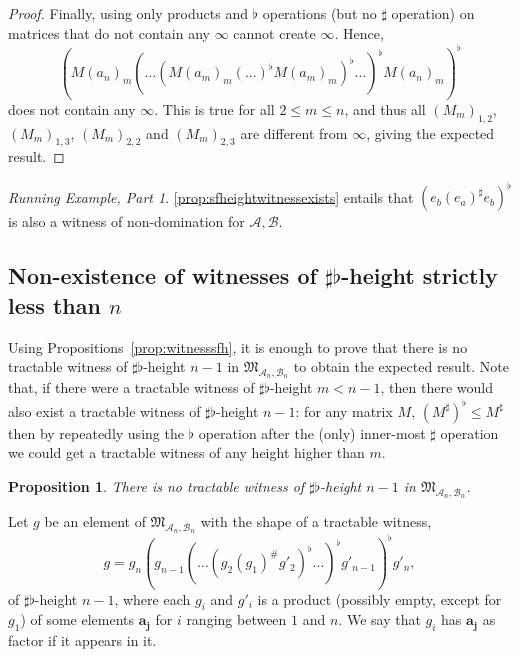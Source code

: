 \documentclass[10pt,a4paper]{amsart}
\newtheorem{prop}[prop]{Proposition}
\theoremstyle{definition}
\numberwithin{equation}{section}
\theoremstyle{remark}
\newcommand{\ideal}{\mathfrak{M}}
\newcommand{\autA}{\mathcal{A}}
\newcommand{\autB}{\mathcal{B}}
\theoremstyle{remark}
\newtheorem{runningexample/}{Running Example, Part}
\newenvironment{runningexample}
  {\renewcommand{\qedsymbol}{\color{darkgray}\ensuremath{\lrcorner}}%
   \pushQED{\qed}\begin{runningexample/}}
  {\popQED\end{runningexample/}}
\begin{document}
\begin{proof}
Finally, using only products and $\flat$ operations (but no $\sharp$ operation) on matrices that do not contain any $\infty$ cannot create $\infty$. Hence, 
$$(M(a_n)_{m} (\ldots (M(a_{m})_{m}(...)^\flat M(a_{m})_{m})^\flat \ldots)^\flat M(a_n)_{m})^{\flat}$$
does not contain any $\infty$. This is true for all $2 \leq m \leq n$, and thus all
$(M_m)_{1,2}$, $(M_m)_{1,3}$, $(M_m)_{2,2}$  and $(M_m)_{2,3}$ are different from $\infty$, giving the expected result.
\end{proof}

\begin{runningexample}
\cref{prop:sfheightwitnessexists} entails that $(e_b(e_a)^\sharp e_b)^\flat$ is also a witness of non-domination for $\autA,\autB$.
\end{runningexample}

\subsection{Non-existence of witnesses of \texorpdfstring{$\sharp\flat$}{\#♭}-height strictly less than \texorpdfstring{$n$}{n}}
\label{section:nonexistence}

Using Propositions~\ref{prop:witnesssfh}, it is enough to prove that there is no tractable witness of $\sharp\flat$-height $n-1$ in $\ideal_{\autA_n,\autB_n}$ to obtain the expected result. Note that, if there were a tractable witness of  $\sharp\flat$-height $m < n-1$, then there would also exist a tractable witness of  $\sharp\flat$-height $n-1$: for any matrix $M$, $(M^\sharp)^\flat \leq M^\sharp$ then by repeatedly using the $\flat$ operation after the (only) inner-most $\sharp$ operation we could get a tractable witness of any height higher than $m$.






\begin{prop}
\label{prop:last}
There is no tractable witness of $\sharp\flat$-height $n-1$ in $\ideal_{\autA_n,\autB_n}$.
\end{prop}

Let $g$ be an element of $\ideal_{\autA_n,\autB_n}$ with the shape of a tractable witness, \[g = g_n (g_{n-1} (\dots (g_{2} (g_{1})^\#g'_{2})^\flat \dots)^\flat g'_{n-1})^\flat g'_{n},\] 
of $\sharp\flat$-height $n-1$, where each $g_i$ and $g'_i$ is a product (possibly empty, except for $g_1$) of some elements $\boldsymbol{a_j}$ for $i$ ranging between $1$ and $n$. We say that $g_i$ has $\boldsymbol{a_j}$ as factor if it appears in it.
\end{document}
